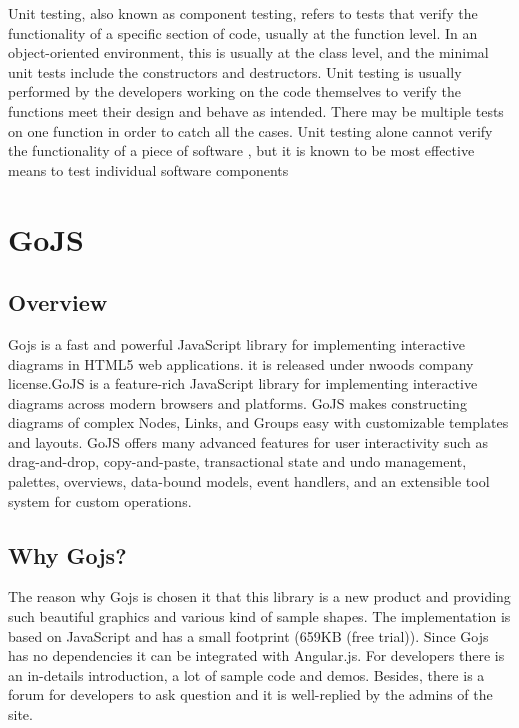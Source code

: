 \documentclass[14pt,a4paper]{extreport}
\begin{document}
Unit testing, also known as component testing, refers to tests that verify the functionality of a specific section of code, usually at the function level. In an object-oriented environment, this is usually at the class level, and the minimal unit tests include the constructors and destructors\cite{Binder}.  Unit testing is usually performed by the developers working on the code themselves to verify the functions meet their design and behave as intended. There may be multiple tests on one function in order to catch all the cases. Unit testing alone cannot verify the functionality of a piece of software \cite{wikiut} , but it is known to be most effective means to test individual software components

	\section{GoJS}
		\subsection{Overview}
		Gojs is a fast and powerful JavaScript library for implementing interactive diagrams in HTML5 web applications. it is released under nwoods company license.GoJS is a feature-rich JavaScript library for implementing interactive diagrams across modern browsers and platforms. GoJS makes constructing diagrams of complex Nodes, Links, and Groups easy with customizable templates and layouts. GoJS offers many advanced features for user interactivity such as drag-and-drop, copy-and-paste, transactional state and undo management, palettes, overviews, data-bound models, event handlers, and an extensible tool system for custom operations. 
		
		\subsection{Why Gojs?}
		The reason why  Gojs is chosen it that this library is a new product and providing such beautiful graphics and various kind of sample shapes. The implementation is based on JavaScript and has a small footprint (659KB (free trial)). Since Gojs has no dependencies it can be integrated with Angular.js. For developers there is an in-details introduction, a lot of sample code and demos. Besides, there is a forum for developers to ask question and it is well-replied by the admins of the site. 
		
\end{document}
